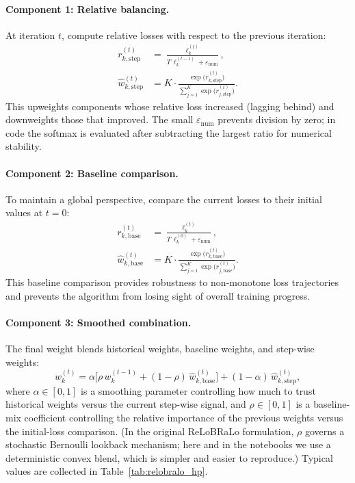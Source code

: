 \documentclass[11pt,a4paper]{report}
\begin{document}
\paragraph{Component 1: Relative balancing.}  At iteration $t$, compute relative losses with respect to the previous iteration:
\begin{equation}
\begin{aligned}
r_{k,\mathrm{step}}^{(t)}
&= \frac{\ell_k^{(t)}}{T\,\ell_k^{(t-1)}+\varepsilon_{\mathrm{num}}},\\
\hat{w}_{k,\mathrm{step}}^{(t)}
&= K \cdot
\frac{\exp\!\bigl(r_{k,\mathrm{step}}^{(t)}\bigr)}
{\sum_{j=1}^{K}\exp\!\bigl(r_{j,\mathrm{step}}^{(t)}\bigr)}.
\end{aligned}
\end{equation}
This upweights components whose relative loss increased (lagging behind) and downweights those that improved.  The small $\varepsilon_{\mathrm{num}}$ prevents division by zero; in code the softmax is evaluated after subtracting the largest ratio for numerical stability.

\paragraph{Component 2: Baseline comparison.}  To maintain a global perspective, compare the current losses to their initial values at $t=0$:
\begin{equation}
\begin{aligned}
r_{k,\mathrm{base}}^{(t)}
&= \frac{\ell_k^{(t)}}{T\,\ell_k^{(0)}+\varepsilon_{\mathrm{num}}},\\
\hat{w}_{k,\mathrm{base}}^{(t)}
&= K \cdot
\frac{\exp\!\bigl(r_{k,\mathrm{base}}^{(t)}\bigr)}
{\sum_{j=1}^{K}\exp\!\bigl(r_{j,\mathrm{base}}^{(t)}\bigr)}.
\end{aligned}
\end{equation}
This baseline comparison provides robustness to non-monotone loss trajectories and prevents the algorithm from losing sight of overall training progress.

\paragraph{Component 3: Smoothed combination.}  The final weight blends historical weights, baseline weights, and step-wise weights:
\begin{equation}
w_k^{(t)} =
\alpha\bigl[\rho\, w_k^{(t-1)} + (1-\rho)\, \hat{w}_{k,\mathrm{base}}^{(t)}\bigr]
+ (1-\alpha)\, \hat{w}_{k,\mathrm{step}}^{(t)},
\label{eq:relobralo_full}
\end{equation}
where $\alpha \in [0,1]$ is a smoothing parameter controlling how much to trust historical weights versus the current step-wise signal, and $\rho \in [0,1]$ is a baseline-mix coefficient controlling the relative importance of the previous weights versus the initial-loss comparison.  (In the original ReLoBRaLo formulation, $\rho$ governs a stochastic Bernoulli lookback mechanism; here and in the notebooks we use a deterministic convex blend, which is simpler and easier to reproduce.)  Typical values are collected in Table~\ref{tab:relobralo_hp}.
\end{document}

